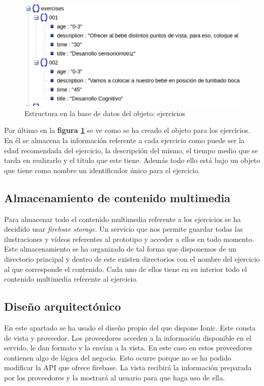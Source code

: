 \medskip
\begin{figure}
    \includegraphics[width=\linewidth]{./images/database/exercises-database.png}
    \caption{Estructura en la base de datos del objeto: ejercicios}
    \label{ejercicios}
\end{figure}

Por último en la \textbf{figura \ref{ejercicios}} se ve
como se ha creado el objeto para los ejercicios. En él se almacena la información
referente a cada ejercicio como puede ser la edad recomendada del ejercicio,
la descripción del mismo, el tiempo medio que se tarda en realizarlo y el
título que este tiene. Además todo ello está bajo un objeto que tiene como
nombre un identificador único para el ejercicio.

\subsection{Almacenamiento de contenido multimedia}

Para almacenar todo el contenido multimedia referente a los ejercicios se ha
decidido usar \textit{firebsae storage}. Un servicio que nos permite guardar
todas las ilustraciones y vídeos referentes al prototipo y acceder a ellos en
todo momento. Este almacenamiento se ha organizado de tal forma que disponemos
de un directorio principal y dentro de este existen directorios con el nombre
del ejercicio al que corresponde el contenido. Cada uno de ellos tiene en su
interior todo el contenido multimedia referente al ejercicio.

\subsection{Diseño arquitectónico}

En este apartado se ha usado el diseño propio del que dispone Ionic. Este consta
de vista y proveedor. Los proveedores acceden a la información disponible en el
servido, le dan formato y la envían a la vista. En este caso en estos proveedores
contienen algo de lógica del negocio. Esto ocurre porque no se ha podido modificar
la API que ofrece firebase. La vista recibirá la información preparada por los
proveedores y la mostrará al usuario para que haga uso de ella.